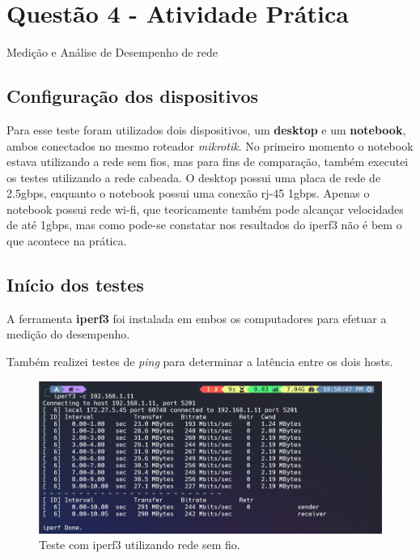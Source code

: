 \documentclass[a4paper,12pt]{article}
\begin{document}
\section*{Questão 4 - Atividade Prática}

Medição e Análise de Desempenho de rede

\subsection*{Configuração dos dispositivos}

Para esse teste foram utilizados dois dispositivos, um \textbf{desktop} e um \textbf{notebook}, ambos conectados no mesmo roteador \textit{mikrotik}. No primeiro momento o notebook estava utilizando a rede sem fios, mas para fins de comparação, também executei os testes utilizando a rede cabeada.
O desktop possui uma placa de rede de 2.5gbps, enquanto o notebook possui uma conexão rj-45 1gbps. 
Apenas o notebook possui rede wi-fi, que teoricamente também pode alcançar velocidades de até 1gbps, mas como pode-se constatar nos resultados do iperf3 não é bem o que acontece na prática. 


\subsection*{Início dos testes}
A ferramenta \textbf{iperf3} foi instalada em embos os computadores para efetuar a medição do desempenho.

Também realizei testes de \textit{ping} para determinar a latência entre os dois hosts.
\begin{figure}[h!]
  \includegraphics[width=1.0\textwidth]{img/iperf3-wifi.png}
  \caption{Teste com iperf3 utilizando rede sem fio.}
\end{figure}
\end{document}

